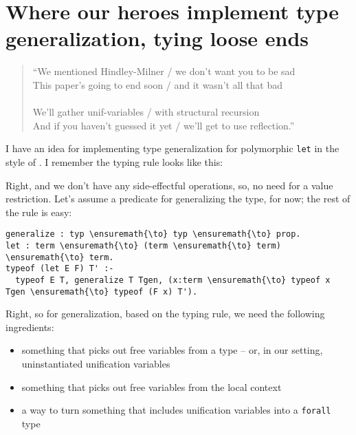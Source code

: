 \section{Where our heroes implement type generalization, tying loose
ends}\label{where-our-heroes-implement-type-generalization-tying-loose-ends}

\begin{verse}
``We mentioned Hindley-Milner / we don't want you to be sad \\
This paper's going to end soon / and it wasn't all that bad \\
\hspace{1em}\vspace{-0.5em} \\
We'll gather unif-variables / with structural recursion \\
And if you haven't guessed it yet / we'll get to use reflection.''
\end{verse}

\heroSTUDENT{} I have an idea for implementing type generalization for
polymorphic \texttt{let} in the style of
\citet{damas1984type,hindley1969principal,milner1978theory}. I remember
the typing rule looks like this:

\vspace{-1.2em}\begin{mathpar}
\end{mathpar}

\heroADVISOR{} Right, and we don't have any side-effectful operations, so, no
need for a value restriction. Let's assume a predicate for generalizing
the type, for now; the rest of the rule is easy:

\begin{verbatim}
generalize : typ \ensuremath{\to} typ \ensuremath{\to} prop.
let : term \ensuremath{\to} (term \ensuremath{\to} term) \ensuremath{\to} term.
typeof (let E F) T' :-
  typeof E T, generalize T Tgen, (x:term \ensuremath{\to} typeof x Tgen \ensuremath{\to} typeof (F x) T').
\end{verbatim}

\heroSTUDENT{} Right, so for generalization, based on the typing rule, we need
the following ingredients:

\begin{itemize}
\tightlist
\item
  something that picks out free variables from a type -- or, in our
  setting, uninstantiated unification variables
\item
  something that picks out free variables from the local context
\item
  a way to turn something that includes unification variables into a
  \texttt{forall} type
\end{itemize}

